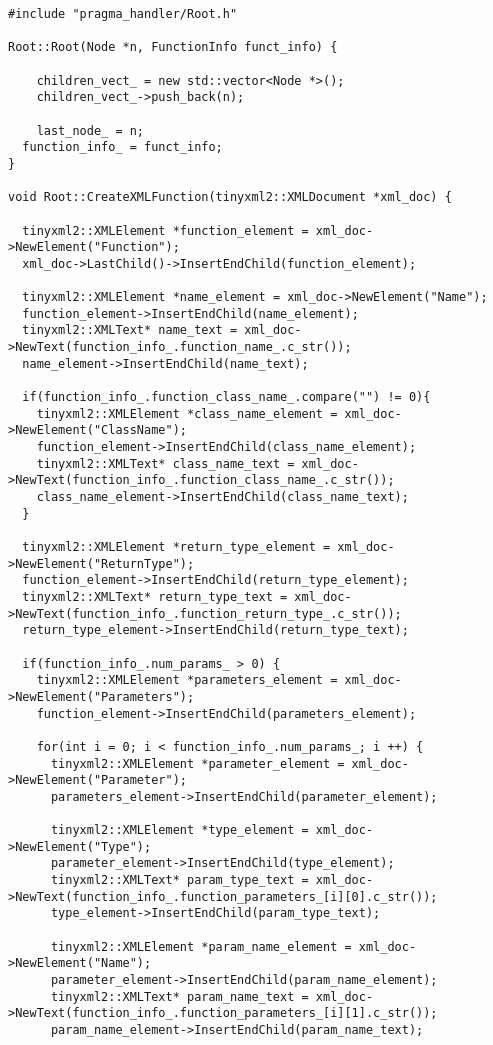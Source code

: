 \documentclass[a4paper,11pt,twoside]{book}
\begin{document}
\begin{lstlisting}[language=CCC, caption=pragma\_handler/Root.cpp]
#include "pragma_handler/Root.h"

Root::Root(Node *n, FunctionInfo funct_info) {

	children_vect_ = new std::vector<Node *>();
	children_vect_->push_back(n);

	last_node_ = n;
  function_info_ = funct_info;
}

void Root::CreateXMLFunction(tinyxml2::XMLDocument *xml_doc) {

  tinyxml2::XMLElement *function_element = xml_doc->NewElement("Function");
  xml_doc->LastChild()->InsertEndChild(function_element);

  tinyxml2::XMLElement *name_element = xml_doc->NewElement("Name");
  function_element->InsertEndChild(name_element); 
  tinyxml2::XMLText* name_text = xml_doc->NewText(function_info_.function_name_.c_str());
  name_element->InsertEndChild(name_text);

  if(function_info_.function_class_name_.compare("") != 0){
    tinyxml2::XMLElement *class_name_element = xml_doc->NewElement("ClassName");
    function_element->InsertEndChild(class_name_element); 
    tinyxml2::XMLText* class_name_text = xml_doc->NewText(function_info_.function_class_name_.c_str());
    class_name_element->InsertEndChild(class_name_text);
  }
    
  tinyxml2::XMLElement *return_type_element = xml_doc->NewElement("ReturnType");
  function_element->InsertEndChild(return_type_element);
  tinyxml2::XMLText* return_type_text = xml_doc->NewText(function_info_.function_return_type_.c_str());
  return_type_element->InsertEndChild(return_type_text);

  if(function_info_.num_params_ > 0) {
    tinyxml2::XMLElement *parameters_element = xml_doc->NewElement("Parameters");
    function_element->InsertEndChild(parameters_element);

    for(int i = 0; i < function_info_.num_params_; i ++) {
      tinyxml2::XMLElement *parameter_element = xml_doc->NewElement("Parameter");
      parameters_element->InsertEndChild(parameter_element);

      tinyxml2::XMLElement *type_element = xml_doc->NewElement("Type");
      parameter_element->InsertEndChild(type_element);
      tinyxml2::XMLText* param_type_text = xml_doc->NewText(function_info_.function_parameters_[i][0].c_str());
      type_element->InsertEndChild(param_type_text);

      tinyxml2::XMLElement *param_name_element = xml_doc->NewElement("Name");
      parameter_element->InsertEndChild(param_name_element);
      tinyxml2::XMLText* param_name_text = xml_doc->NewText(function_info_.function_parameters_[i][1].c_str());
      param_name_element->InsertEndChild(param_name_text);


\end{lstlisting}
\end{document}
